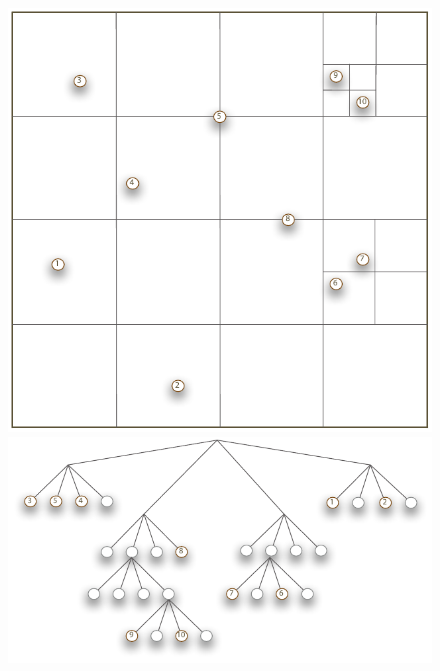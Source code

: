 \begin{frame}[fragile]
\begin{figure}
\begin{minipage}{0.75\linewidth}
    \hfill
    \includegraphics[scale=0.2]{figures/spatial-ortho-split.pdf}
    \hfill
    \includegraphics[scale=0.3]{figures/spatial-ortho-tree.pdf}
  \end{minipage}
  \end{figure}
%
\end{frame}

